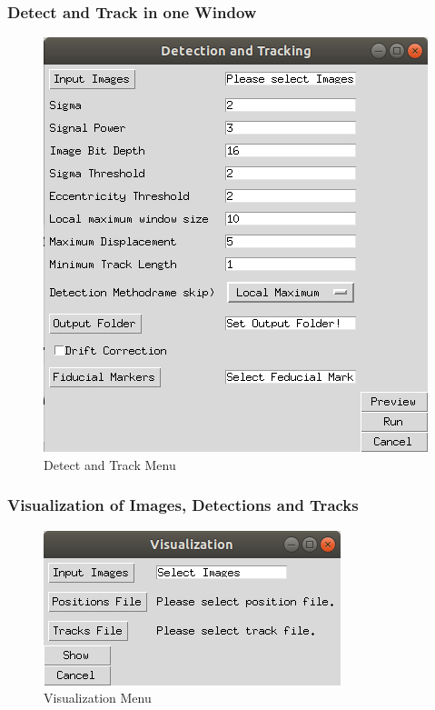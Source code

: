 \documentclass[oneside,letterpaper]{scrartcl}
\def\myscale{0.55}
\begin{document}
\subsubsection{Detect and Track in one Window}
\begin{figure}
\centering
\includegraphics[scale=\myscale]{Figures/DetandTrackGUI.jpg}
\caption{Detect and Track Menu}
\end{figure}


\subsubsection{Visualization of Images, Detections and Tracks}
\begin{figure}
\centering
\includegraphics[scale=\myscale]{Figures/VisualizationGUI.jpg}
\caption{Visualization Menu}
\end{figure}
\end{document}
